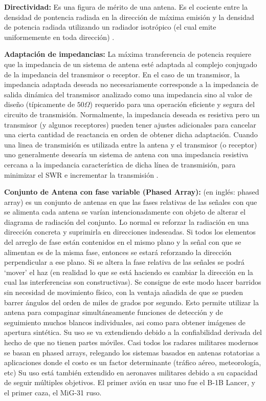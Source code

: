 
{\textbf{Directividad:}} Es una figura de mérito de una antena. Es el cociente entre la densidad de pontencia radiada en la 
dirección de máxima emisión y la densidad de potencia radiada utilizando un radiador isotrópico (el cual emite uniformemente
en toda dirección) \cite{DirectivityWiki}.


{\textbf{Adaptación de impedancias:}} La máxima transferencia de potencia requiere que la impedancia de un sistema de 
antena esté adaptada al complejo conjugado de la impedancia del transmisor o receptor. En el caso de un transmisor, 
la impedancia adaptada deseada no necesariamente corresponde a la impedancia de salida dinámica del transmisor analizado
como una impedancia sino al valor de diseño (típicamente de $50 \Omega$) requerido para una operación eficiente
y segura del circuito de transmisión. Normalmente, la impedancia deseada es resistiva pero un transmisor (y algunos receptores)
pueden tener ajustes adicionales para cancelar una cierta cantidad de reactancia en orden de obtener dicha adaptación. Cuando
una linea de transmisión es utilizada entre la antena y el transmisor (o receptor) uno generalmente desearía un sistema de antena
con una impedancia resistiva cercana a la impedancia característica de dicha línea de transmisión, para minimizar el SWR 
e incrementar la transmisión \cite{AntennaWiki}. 

{\textbf{Conjunto de Antena con fase variable (Phased Array):}}  (en inglés: phased array) es un conjunto de antenas en que las fases relativas de las 
señales con que se alimenta cada antena se varían intencionadamente con objeto de alterar el diagrama de radiación del 
conjunto. Lo normal es reforzar la radiación en una dirección concreta y suprimirla en direcciones indeseadas. Si todos los 
elementos del arreglo de fase están contenidos en el mismo plano y la señal con que se alimentan es de la misma fase, 
entonces se estará reforzando la dirección perpendicular a ese plano. Si se altera la fase relativa de las señales se podrá
\enquote*{mover} el haz (en realidad lo que se está haciendo es cambiar la dirección en la cual las interferencias son 
constructivas). Se consigue de este modo hacer barridos sin necesidad de movimiento físico, con la ventaja añadida de que 
se pueden barrer ángulos del orden de miles de grados por segundo. Esto permite utilizar la antena para compaginar 
simultáneamente funciones de detección y de seguimiento muchos blancos individuales, asi como para obtener imágenes de 
apertura sintética. Su uso se va extendiendo debido a la confiabilidad derivada del hecho de que no tienen partes móviles. 
Casi todos los radares militares modernos se basan en phased arrays, relegando los sistemas basados en antenas rotatorias a 
aplicaciones donde el costo es un factor determinante (tráfico aéreo, meteorología, etc) Su uso está también extendido en
aeronaves militares debido a su capacidad de seguir múltiples objetivos. El primer avión en usar uno fue el B-1B Lancer, y 
el primer caza, el MiG-31 ruso.\\

